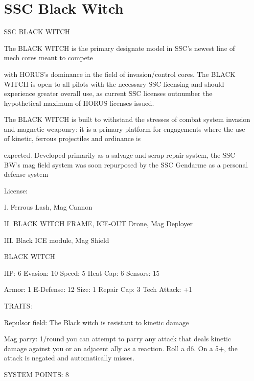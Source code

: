 \section{SSC Black Witch}


                                            SSC BLACK WITCH

The BLACK WITCH is the primary designate model in SSC’s newest line of mech cores meant to compete

with HORUS’s dominance in the field of invasion/control cores. The BLACK WITCH is open to all pilots with
the necessary SSC licensing and should experience greater overall use, as current SSC licenses outnumber
the hypothetical maximum of HORUS licenses issued.

The BLACK WITCH is built to withstand the stresses of combat system invasion and magnetic weaponry: it
is a primary platform for engagements where the use of kinetic, ferrous projectiles and ordinance is

expected. Developed primarily as a salvage and scrap repair system, the SSC-BW’s mag field system was
soon repurposed by the SSC Gendarme as a personal defense system




                                                  License:

I. Ferrous Lash, Mag Cannon

II. BLACK WITCH FRAME, ICE-OUT Drone, Mag Deployer

III. Black ICE module, Mag Shield


                                             BLACK WITCH

 HP: 6          Evasion: 10                          Speed: 5           Heat Cap: 6        Sensors: 15

 Armor: 1       E-Defense: 12                        Size: 1            Repair Cap: 3      Tech Attack:
                                                                                           +1

                                                  TRAITS:

 Repulsor field: The Black witch is resistant to kinetic damage

 Mag parry: 1/round you can attempt to parry any attack that deals kinetic damage against you or an
 adjacent ally as a reaction. Roll a d6. On a 5+, the attack is negated and automatically misses.

                                            SYSTEM POINTS: 8

